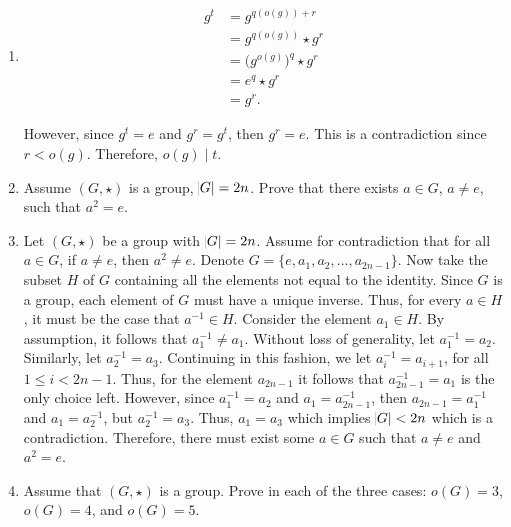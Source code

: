 \documentclass[12pt]{article}
\makeatletter
\theoremstyle{definition}
\theoremstyle{remark}
\renewenvironment{proof}[1][\proofname]{\par
  \pushQED{\qed}%
  \normalfont \topsep6\p@\@plus6\p@\relax
  \list{}{\leftmargin=0mm
          \rightmargin=4mm
          \settowidth{\itemindent}{\itshape#1}%
          \labelwidth=\itemindent
          \parsep=0pt \listparindent=\parindent 
  }
  \item[\hskip\labelsep
        \itshape
    #1\@addpunct{.}]\ignorespaces
}{%
  \popQED\endlist\@endpefalse
}
\let\oldproofname=\proofname
\renewcommand{\proofname}{\bf{\textit{\oldproofname}}}
\makeatother
\begin{document}
\begin{enumerate}[leftmargin=*]
\begin{proof}
    \begin{equation*}
        \begin{split}
            g^t &= g^{q(o(g))+r} \\
                &= g^{q(o(g))}\star g^r \\
                &= \big(g^{o(g)}\big)^q\star g^r \\
                &= e^q\star g^r \\
                &= g^r.
        \end{split}
    \end{equation*}
    
    However, since $g^t=e$ and $g^r=g^t$, then $g^r=e$. This is a contradiction since $r<o(g)$. Therefore, $o(g)\mid t$.
\end{proof}

\item Assume $(G,\star)$ is a group, $\abs{G}=2n$. Prove that there exists $a\in G$, $a\neq e$, such that $a^2=e$.

\begin{proof}
    Let $(G,\star)$ be a group with $\abs{G}=2n$. Assume for contradiction that for all $a\in G$, if $a\neq e$, then $a^2\neq e$. Denote $G=\{e,a_1,a_2,\dots,a_{2n-1}\}$. Now take the subset $H$ of $G$ containing all the elements not equal to the identity. Since $G$ is a group, each element of $G$ must have a unique inverse. Thus, for every $a\in H$, it must be the case that $a^{-1}\in H$. Consider the element $a_1\in H$. By assumption, it follows that $a_1^{-1}\neq a_1$. Without loss of generality, let $a_1^{-1}=a_2$. Similarly, let $a_2^{-1}=a_3$. Continuing in this fashion, we let $a_i^{-1}=a_{i+1}$, for all $1\leq i<2n-1$. Thus, for the element $a_{2n-1}$ it follows that $a_{2n-1}^{-1}=a_1$ is the only choice left. However, since $a_1^{-1}=a_2$ and $a_1=a_{2n-1}^{-1}$, then $a_{2n-1}=a_1^{-1}$ and $a_1=a_2^{-1}$, but $a_2^{-1}=a_3$. Thus, $a_1=a_3$ which implies $\abs{G}<2n$ which is a contradiction. Therefore, there must exist some $a\in G$ such that $a\neq e$ and $a^2=e$.
\end{proof}

\newpage

\item Assume that $(G,\star)$ is a group. Prove in each of the three cases: $o(G)=3$, $o(G)=4$, and $o(G)=5$.


\end{enumerate}
\end{document}
